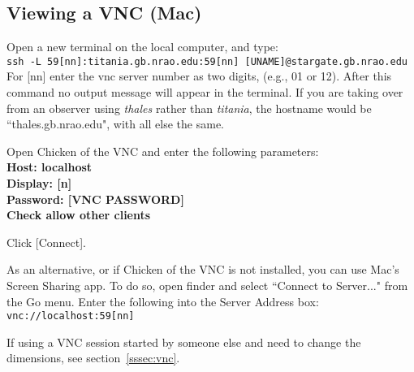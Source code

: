 \documentclass[11pt]{article}
\begin{document}
\subsection{Viewing a VNC (Mac)}\label{ssec:vncm}  %
Open a new terminal on the local computer, and type: \\
\indent\texttt{ssh -L 59[nn]:titania.gb.nrao.edu:59[nn] [UNAME]@stargate.gb.nrao.edu} \\
For [nn] enter the vnc server number as two digits, (e.g., 01 or 12). After this command no output message will appear in the terminal.  If you are taking over from an observer using \textit{thales} rather than \textit{titania}, the hostname would be ``thales.gb.nrao.edu", with all else the same.  

\noindent Open Chicken of the VNC and enter the following parameters: \\
\indent\textbf{Host: localhost \\
\indent Display: [n] \\
\indent Password: [VNC PASSWORD] \\
\indent Check allow other clients }

\noindent Click [Connect].

\noindent As an alternative, or if Chicken of the VNC is not installed, you can use Mac's Screen Sharing app. To do so, open finder and select ``Connect to Server..." from the Go menu. Enter the following into the Server Address box: \\
\indent\texttt{vnc://localhost:59[nn]}

\noindent If using a VNC session started by someone else and need to change the dimensions, see section~\ref{sssec:vnc}. 


\end{document}
